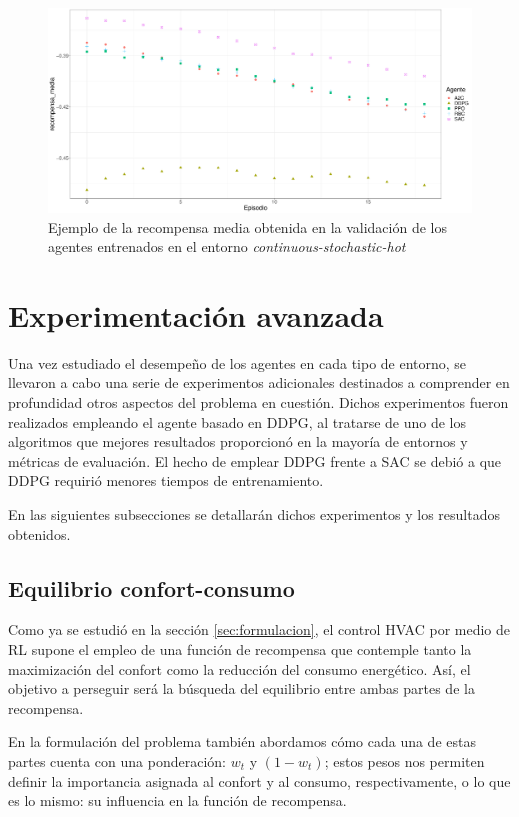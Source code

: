 \begin{figure}
    \centering
    \includegraphics[width=\textwidth]{imagenes/recompensa-cont-hot.pdf}
    \caption{Ejemplo de la recompensa media obtenida en la validación de los agentes entrenados en el entorno \textit{continuous-stochastic-hot}}
    \label{fig:recompensa-cont-hot}
\end{figure}

\section{Experimentación avanzada}

Una vez estudiado el desempeño de los agentes en cada tipo de entorno, se llevaron a cabo una serie de experimentos adicionales destinados a comprender en profundidad otros aspectos del problema en cuestión. Dichos experimentos fueron realizados empleando el agente basado en DDPG, al tratarse de uno de los algoritmos que mejores resultados proporcionó en la mayoría de entornos y métricas de evaluación. El hecho de emplear DDPG frente a SAC se debió a que DDPG requirió menores tiempos de entrenamiento.

En las siguientes subsecciones se detallarán dichos experimentos y los resultados obtenidos.

\subsection{Equilibrio confort-consumo}
\label{sec:conf-con}

Como ya se estudió en la sección \ref{sec:formulacion}, el control HVAC por medio de RL supone el empleo de una función de recompensa que contemple tanto la maximización del confort como la reducción del consumo energético. Así, el objetivo a perseguir será la búsqueda del equilibrio entre ambas partes de la recompensa.

En la formulación del problema también abordamos cómo cada una de estas partes cuenta con una ponderación: $w_t$ y $(1-w_t)$; estos pesos nos permiten definir la importancia asignada al confort y al consumo, respectivamente, o lo que es lo mismo: su influencia en la función de recompensa.


